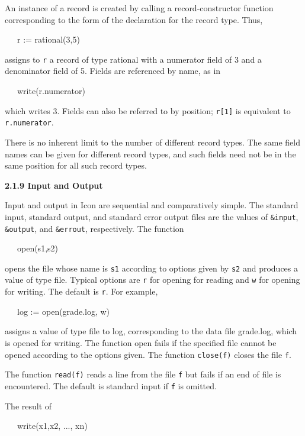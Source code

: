 An instance of a record is created by calling a record-constructor
function corresponding to the form of the declaration for the record
type. Thus,

{\ttfamily\mdseries
\ \ \ r := rational(3,5)}

\noindent
assigns to \texttt{r} a record of type rational with a
numerator field of 3 and a denominator field of 5. Fields are
referenced by name, as in

{\ttfamily\mdseries
\ \ \ write(r.numerator)}

\noindent which writes 3. Fields can also be referred to by position;
\texttt{r[1]} is equivalent to \texttt{r.numerator}.

There is no inherent limit to the number of different record
types. The same field names can be given for different record types,
and such fields need not be in the same position for all such record
types.

{\sffamily\bfseries
2.1.9 Input and Output}

Input and output in Icon are sequential and comparatively simple. The
standard input, standard output, and standard error output files are
the values of \texttt{\&input}, \texttt{\&output}, and
\texttt{\&errout}, respectively. The function

{\ttfamily\mdseries
\ \ \ open(s1,s2)}

\noindent opens the file whose name is \texttt{s1} according to
options given by \texttt{s2} and produces a value of type file.
Typical options are \texttt{{\textquotedbl}r{\textquotedbl}} for
opening for reading and \texttt{{\textquotedbl}w{\textquotedbl}} for
opening for writing. The default is
\texttt{{\textquotedbl}r{\textquotedbl}}. For example,

{\ttfamily\mdseries
\ \ \ log := open({\textquotedbl}grade.log{\textquotedbl}, {\textquotedbl}w{\textquotedbl})}

\noindent assigns a value of type file to log, corresponding to the
data file grade.log, which is opened for writing. The function open
fails if the specified file cannot be opened according to the options
given. The function \texttt{close(f)} closes the file \texttt{f}.

The function \texttt{read(f)} reads a line from the file \texttt{f}
but fails if an end of file is encountered. The default is standard
input if \texttt{f} is omitted.

The result of

{\ttfamily\mdseries
\ \ \ write(x1,x2, ..., xn)}

